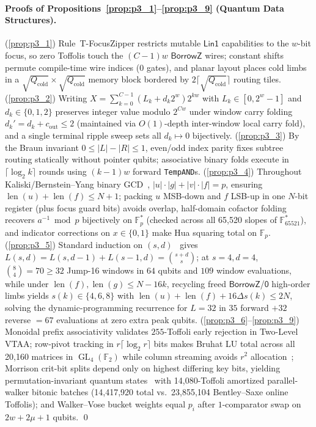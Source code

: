 \documentclass[acmsmall,screen,anonymous]{acmart}
\DeclareRobustCommand{\_}{\ifmmode\text{\char95}\else\char95\penalty0\relax\fi}
\theoremstyle{plain}
\newcommand{\CapZero}{\ensuremath{\mathsf{0}}}
\newcommand{\CapBorrowZ}{\ensuremath{\mathsf{BorrowZ}}}
\newcommand{\CapLin}{\ensuremath{\mathsf{Lin1}}}
\begin{document}
\paragraph{Proofs of Propositions~\ref{prop:p3_1}--\ref{prop:p3_9} (Quantum Data Structures).}
(\ref{prop:p3_1}) Rule~\textsf{T-FocusZipper} restricts mutable $\CapLin$ capabilities to the $w$-bit focus, so zero Toffolis touch the $(C-1)w$ $\CapBorrowZ$ wires; constant shifts permute compile-time wire indices ($0$ gates), and planar layout places cold limbs in a $\sqrt{Q_{\mathrm{cold}}} \times \sqrt{Q_{\mathrm{cold}}}$ memory block bordered by $2\lceil\sqrt{Q_{\mathrm{cold}}}\rceil$ routing tiles.
(\ref{prop:p3_2}) Writing $X = \sum_{k=0}^{C-1} (L_k + d_k 2^w) 2^{k w}$ with $L_k \in [0, 2^w - 1]$ and $d_k \in \{0, 1, 2\}$ preserves integer value modulo $2^{C w}$ under window carry folding $d_k' = d_k + c_{\mathrm{out}} \le 2$ (maintained via $O(1)$-depth inter-window local carry fold), and a single terminal ripple sweep sets all $d_k \mapsto 0$ bijectively.
(\ref{prop:p3_3}) By the Braun invariant $0 \le |L| - |R| \le 1$, even/odd index parity fixes subtree routing statically without pointer qubits; associative binary folds execute in $\lceil \log_2 k \rceil$ rounds using $(k - 1)w$ forward \texttt{TempAND}s.
(\ref{prop:p3_4}) Throughout Kaliski/Bernstein--Yang binary GCD~\cite{kaliski1995,bernsteinyang2019}, $|u| \cdot |g| + |v| \cdot |f| = p$, ensuring $\operatorname{len}(u) + \operatorname{len}(f) \le N + 1$; packing $u$ MSB-down and $f$ LSB-up in one $N$-bit register (plus focus guard bits) avoids overlap, half-domain cofactor folding recovers $a^{-1} \bmod p$ bijectively on $\mathbb{F}_p^*$ (checked across all 65,520 slopes of $\mathbb{F}_{65521}^*$), and indicator corrections on $x \in \{0, 1\}$ make Hua squaring total on $\mathbb{F}_p$.
(\ref{prop:p3_5}) Standard induction on $(s, d)$~\cite{bennett1989,kralovic2001} gives $L(s, d) = L(s, d-1) + L(s-1, d) = \binom{s+d}{s}$; at $s=4, d=4$, $\binom{8}{4} = 70 \ge 32$ Jump-16 windows in $64$ qubits and $109$ window evaluations, while under $\operatorname{len}(f), \operatorname{len}(g) \le N - 16k$, recycling freed $\CapBorrowZ$/$\CapZero$ high-order limbs yields $s(k) \in \{4,6,8\}$ with $\operatorname{len}(u) + \operatorname{len}(f) + 16\Delta s(k) \le 2N$, solving the dynamic-programming recurrence for $L = 32$ in $35$ forward $+ 32$ reverse $= 67$ evaluations at zero extra peak qubits.
(\ref{prop:p3_6}--\ref{prop:p3_9}) Monoidal prefix associativity validates $255$-Toffoli early rejection in Two-Level VTAA; row-pivot tracking in $r\lceil\log_2 r\rceil$ bits makes Bruhat LU total across all 20,160 matrices in $\operatorname{GL}_4(\mathbb{F}_2)$ while column streaming avoids $r^2$ allocation~\cite{perriello2023}; Morrison crit-bit splits depend only on highest differing key bits, yielding permutation-invariant quantum states~\cite{zhandry2019} with 14,080-Toffoli amortized parallel-walker bitonic batches (14,417,920 total vs.\ 23,855,104 Bentley--Saxe online Toffolis); and Walker--Vose bucket weights equal $p_i$ after $1$-comparator swap on $2w + 2\mu + 1$ qubits. \qed
\end{document}
